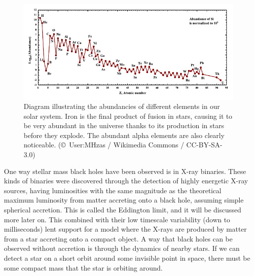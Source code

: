 \documentclass[english, oneside]{HYgradu}
\begin{document}
\begin{figure}
\centering
\includegraphics[width=\textwidth]{../images/SolarSystemAbundances.pdf}
\caption{Diagram illustrating the abundancies of different elements in our solar system. Iron is the final product of fusion in stars, causing it to be very abundant in the universe thanks to its production in stars before they explode. The abundant alpha elements are also clearly noticeable.
(\copyright \ User:MHz\textasciigrave as / Wikimedia Commons / CC-BY-SA-3.0)}
\label{fig:IronPeak}
\end{figure}

One way stellar mass black holes have been observed is in X-ray binaries. These kinds of binaries were discovered through the detection of highly energetic X-ray sources, having luminosities with the same magnitude as the theoretical maximum luminosity from matter accreting onto a black hole, assuming simple spherical accretion. This is called the Eddington limit, and it will be discussed more later on. This combined with their low timescale variability (down to milliseconds) lent support for a model where the X-rays are produced by matter from a star accreting onto a compact object. A way that black holes can be observed without accretion is through the dynamics of nearby stars. If we can detect a star on a short orbit around some invisible point in space, there must be some compact mass that the star is orbiting around.
\end{document}
